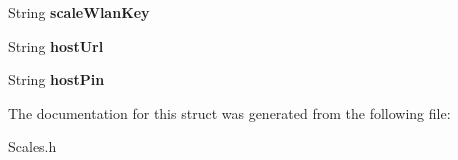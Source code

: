 \begin{DoxyCompactItemize}
\item 
\hypertarget{structsettings__t_a93af0ae8e18ad1318da9fe0e9939eeab}{String {\bfseries scale\-Wlan\-Key}}\label{structsettings__t_a93af0ae8e18ad1318da9fe0e9939eeab}

\item 
\hypertarget{structsettings__t_aebadc06a3a63ad6ffd5f7700f131547f}{String {\bfseries host\-Url}}\label{structsettings__t_aebadc06a3a63ad6ffd5f7700f131547f}

\item 
\hypertarget{structsettings__t_a61781988b5c127f9fcf572aad6639b39}{String {\bfseries host\-Pin}}\label{structsettings__t_a61781988b5c127f9fcf572aad6639b39}

\end{DoxyCompactItemize}


The documentation for this struct was generated from the following file\-:\begin{DoxyCompactItemize}
\item 
Scales.\-h\end{DoxyCompactItemize}
